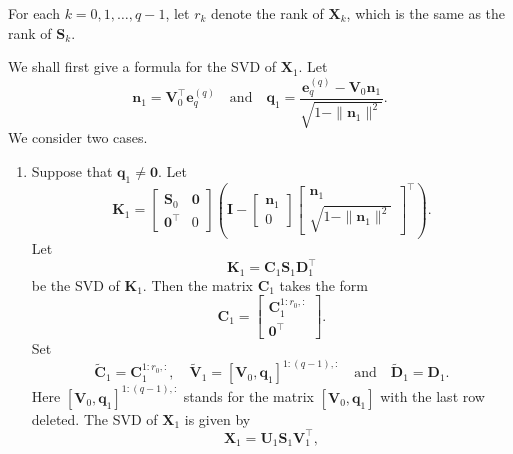 \documentclass[11pt,a4paper]{article}
\newcommand{\0}{\M{0}}
\newcommand{\M}[1]{\mathbf{#1}}
\newcommand{\Mt}[1]{\tilde{\M{#1}}}
\newcommand{\T}{\top}
\newcommand{\ve}[1]{\mathbf{#1}}
\newcommand{\eve}[2]{\mathbf{e}^{(#1)}_{#2}}
\begin{document}
For each $k = 0, 1, \dots, q-1$, let $r_k$ denote the rank of $\M{X}_k$, which is the same as the rank of $\M{S}_k$.

We shall first give a formula for the SVD of $\M{X}_1$. Let
\begin{displaymath}
  \ve{n}_1 = \M{V}_0^\T \eve{q}{q}
  \quad
  \text{and}
  \quad
  \ve{q}_1 =  \frac{\eve{q}{q} - \M{V}_0 \ve{n}_1}{\sqrt{1 - \| \ve{n}_1\|^2}}.
\end{displaymath}
We consider two cases.
\begin{enumerate}[font=\upshape,label=(\roman*),wide,align=right]
\item Suppose that $\ve{q}_1 \neq \0$. Let
  \begin{displaymath}
    \M{K}_1
    =
    \begin{bmatrix}
      \M{S}_0 & \0
      \\
      \0^\T & 0
    \end{bmatrix}
    \left(
      \M{I}
      -
      \begin{bmatrix}
        \ve{n}_1
        \\
        0
      \end{bmatrix}
      \begin{bmatrix}
        \ve{n}_1
        \\
        \sqrt{1 - \| \ve{n}_1 \|^2}
      \end{bmatrix}^\T
    \right).
  \end{displaymath}
  Let
  \begin{displaymath}
    \M{K}_1 = \M{C}_1 \M{S}_1  \M{D}_1^\T
  \end{displaymath}
  be the SVD of $\M{K}_1$.  Then the matrix $\M{C}_1$ takes the form
  \begin{displaymath}
    \M{C}_1
    =
    \begin{bmatrix}
      \M{C}_1^{1:r_0, :} 
      \\
      \0^\T 
    \end{bmatrix}.
  \end{displaymath}
  Set
  \begin{displaymath}
    \Mt{C}_1 = \M{C}^{1:r_0,:}_1,
    \quad
    \Mt{V}_1 = [\M{V}_0, \ve{q}_1]^{1:(q - 1),:}
    \quad
    \text{and}
    \quad
    \Mt{D}_1 = \M{D}_1.
  \end{displaymath}
  Here $[\M{V}_0, \ve{q}_1]^{1:(q - 1),:}$ stands for the matrix $[\M{V}_0, \ve{q}_1]$ with the last row deleted. The SVD of $\M{X}_1$ is given by
  \begin{displaymath}
    \M{X}_1 = \M{U}_1 \M{S}_1\M{V}_1^\T,

\end{displaymath}
\end{enumerate}
\end{document}
